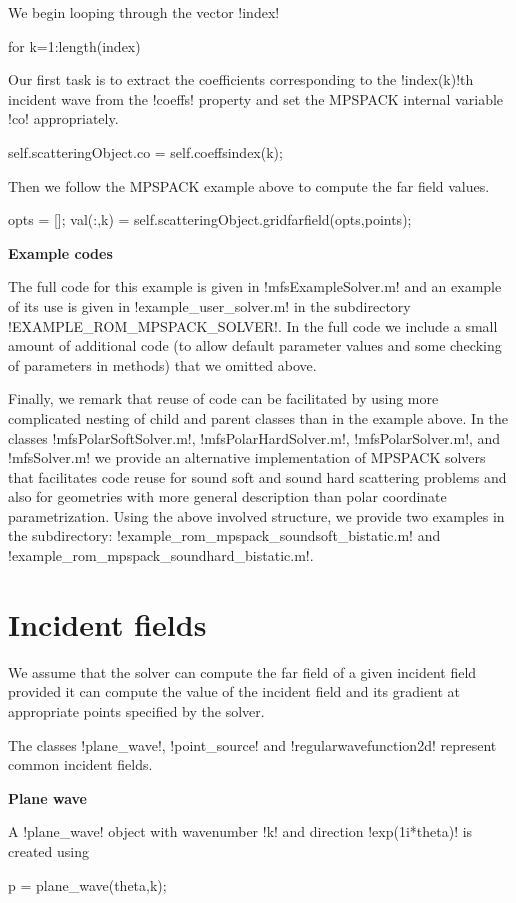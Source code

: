 \documentclass[12pt,letterpaper,final]{article}
\newcommand{\techheading}[1]{%
    \par\vspace{-0.3\parskip}\noindent\hspace{-1cm}\textbf{#1}%
    \par\vspace{-0.5\parskip}\noindent\nopagebreak\ignorespaces}
\begin{document}
We begin looping through the vector !index!
\begin{matlab}                       
    for k=1:length(index)
\end{matlab}
Our first task is to extract the coefficients corresponding to the
!index(k)!th incident wave from the !coeffs! property and set the
MPSPACK internal variable !co! appropriately.
\begin{matlab}
        self.scatteringObject.co = self.coeffs{index(k)};
\end{matlab}
Then we follow the MPSPACK example above to compute the far field values.
\begin{matlab}
        opts = [];
        val(:,k) = self.scatteringObject.gridfarfield(opts,points);
\end{matlab}

\techheading{Example codes} 
The full code for this example is given in !mfsExampleSolver.m! and
an example of its use is given in !example_user_solver.m! in the   subdirectory !EXAMPLE_ROM_MPSPACK_SOLVER!. 
In the full code we include a small amount of additional code (to 
allow default parameter values and some checking of parameters in methods)
that we omitted above. 

Finally, we remark that reuse of code can be facilitated by using more
complicated nesting of child and parent classes than in the example above.
In the classes
!mfsPolarSoftSolver.m!,
!mfsPolarHardSolver.m!,
!mfsPolarSolver.m!, and
!mfsSolver.m!
we provide an alternative implementation of MPSPACK solvers that facilitates
code reuse for sound soft and sound hard scattering problems and
also for geometries with more general description than polar coordinate
parametrization. Using the above involved structure, we provide two examples in
the subdirectory: 
!example_rom_mpspack_soundsoft_bistatic.m! and !example_rom_mpspack_soundhard_bistatic.m!.

\section{Incident fields}

We assume that the solver can compute the far field of a given incident
field provided it can compute the value of the incident field and its
gradient at appropriate points specified by the solver.

The classes !plane_wave!, !point_source! and 
!regularwavefunction2d! represent common incident fields.

\techheading{Plane wave}
A !plane_wave! object with wavenumber !k! and direction
!exp(1i*theta)! is created using
\begin{matlab}
p = plane_wave(theta,k);
\end{matlab}
\end{document}
